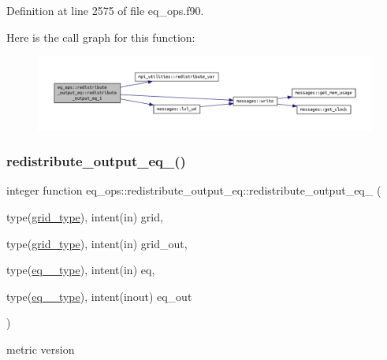 Definition at line 2575 of file eq\+\_\+ops.\+f90.

Here is the call graph for this function\+:\nopagebreak
\begin{figure}[H]
\begin{center}
\leavevmode
\includegraphics[width=350pt]{interfaceeq__ops_1_1redistribute__output__eq_ac77911cf8c4631896ad2d0fff66e6893_cgraph}
\end{center}
\end{figure}
\mbox{\label{interfaceeq__ops_1_1redistribute__output__eq_afdbe3be15436f6abd965bd301ffd819d}} 
\subsubsection{\texorpdfstring{redistribute\+\_\+output\+\_\+eq\+\_()}{redistribute\_output\_eq\_2()}}
{\footnotesize\ttfamily integer function eq\+\_\+ops\+::redistribute\+\_\+output\+\_\+eq\+::redistribute\+\_\+output\+\_\+eq\+\_ (\begin{DoxyParamCaption}\item[{type(\hyperlink{structgrid__vars_1_1grid__type}{grid\+\_\+type}), intent(in)}]{grid,  }\item[{type(\hyperlink{structgrid__vars_1_1grid__type}{grid\+\_\+type}), intent(in)}]{grid\+\_\+out,  }\item[{type(\hyperlink{structeq__vars_1_1eq__2__type}{eq\+\_\+2\+\_\+type}), intent(in)}]{eq,  }\item[{type(\hyperlink{structeq__vars_1_1eq__2__type}{eq\+\_\+2\+\_\+type}), intent(inout)}]{eq\+\_\+out }\end{DoxyParamCaption})}



metric version 


